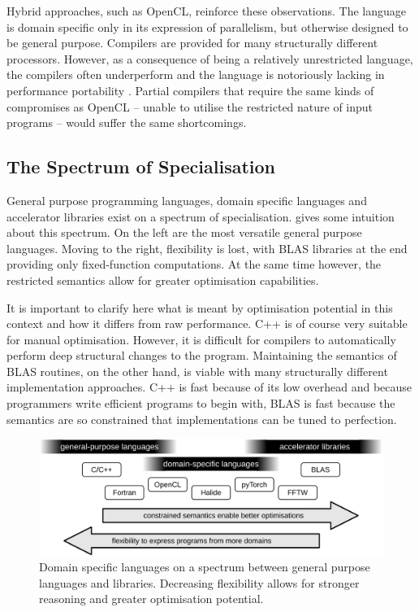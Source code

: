     Hybrid approaches, such as OpenCL, reinforce these observations.
    The language is domain specific only in its expression of parallelism, but
    otherwise designed to be general purpose.
    Compilers are provided for many structurally different processors.
    However, as a consequence of being a relatively unrestricted language, the
    compilers often underperform and the language is notoriously lacking in
    performance portability \citep{Falch:2015:MLB:2863697.2864570}.
    Partial compilers that require the same kinds of compromises as OpenCL --
    unable to utilise the restricted nature of input programs -- would suffer
    the same shortcomings.

\subsection{The Spectrum of Specialisation}

    General purpose programming languages, domain specific languages and
    accelerator libraries exist on a spectrum of specialisation.
     gives some intuition about this spectrum.
    On the left are the most versatile general purpose languages.
    Moving to the right, flexibility is lost, with BLAS libraries at the end
    providing only fixed-function computations.
    At the same time however, the restricted semantics allow for greater 
    optimisation capabilities.

    It is important to clarify here what is meant by optimisation potential in
    this context and how it differs from raw performance.
    C++ is of course very suitable for manual optimisation.
    However, it is difficult for compilers to automatically perform deep
    structural changes to the program.
    Maintaining the semantics of BLAS routines, on the other hand, is viable
    with many structurally different implementation approaches.
    C++ is fast because of its low overhead and because programmers write
    efficient programs to begin with, BLAS is fast because the semantics are so
    constrained that implementations can be tuned to perfection.

\begin{figure}[t]
\centering
\includegraphics[width=\textwidth]{figures/DSLgradient}
\caption{Domain specific languages on a spectrum between general purpose
         languages and libraries.
         Decreasing flexibility allows for stronger reasoning and greater
         optimisation potential.}
\label{specialgradient}
\end{figure}

